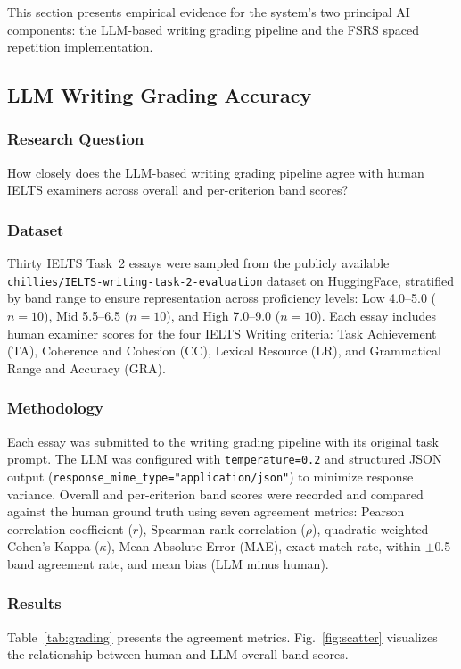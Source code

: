 \documentclass{IEEEtran}
\begin{document}
This section presents empirical evidence for the system's two principal AI components: the LLM-based writing grading pipeline and the FSRS spaced repetition implementation.

\subsection{LLM Writing Grading Accuracy}

\subsubsection{Research Question}
How closely does the LLM-based writing grading pipeline agree with human IELTS examiners across overall and per-criterion band scores?

\subsubsection{Dataset}
Thirty IELTS Task~2 essays were sampled from the publicly available \texttt{chillies/IELTS-writing-task-2-evaluation} dataset on HuggingFace, stratified by band range to ensure representation across proficiency levels: Low 4.0--5.0 ($n=10$), Mid 5.5--6.5 ($n=10$), and High 7.0--9.0 ($n=10$). Each essay includes human examiner scores for the four IELTS Writing criteria: Task Achievement (TA), Coherence and Cohesion (CC), Lexical Resource (LR), and Grammatical Range and Accuracy (GRA).

\subsubsection{Methodology}
Each essay was submitted to the writing grading pipeline with its original task prompt. The LLM was configured with \texttt{temperature=0.2} and structured JSON output (\texttt{response\_mime\_type="application/json"}) to minimize response variance. Overall and per-criterion band scores were recorded and compared against the human ground truth using seven agreement metrics: Pearson correlation coefficient ($r$), Spearman rank correlation ($\rho$), quadratic-weighted Cohen's Kappa ($\kappa$), Mean Absolute Error (MAE), exact match rate, within-$\pm$0.5 band agreement rate, and mean bias (LLM minus human).

\subsubsection{Results}
Table~\ref{tab:grading} presents the agreement metrics. Fig.~\ref{fig:scatter} visualizes the relationship between human and LLM overall band scores.
\end{document}
